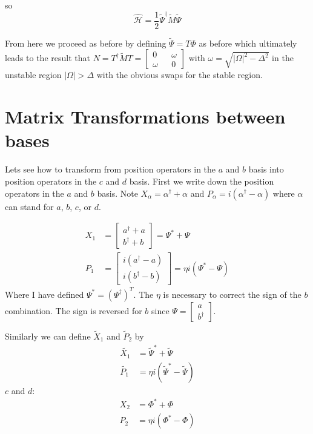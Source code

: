 \documentclass[12pt]{article}
\begin{document}
so
\begin{equation}
\hat{\mathcal{H}} = \frac{1}{2}\tilde{\Psi}^{\dag}\tilde{M}\tilde{\Psi}
\end{equation}

From here we proceed as before by defining $\tilde{\Psi} = T \Phi$ as before which ultimately leads to the result that $N = T^{\dag}\tilde{M}T = \begin{bmatrix}0&&\omega\\\omega&&0\end{bmatrix}$ with $\omega = \sqrt{|\Omega|^2-\Delta^2}$ in the unstable region $|\Omega|>\Delta$ with the obvious swaps for the stable region.

\section{Matrix Transformations between bases}

Lets see how to transform from position operators in the $a$ and $b$ basis into position operators in the $c$ and $d$ basis. First we write down the position operators in the $a$ and $b$ basis. Note $X_{\alpha} = \alpha^{\dag}+\alpha$ and $P_{\alpha} = i(\alpha^{\dag}-\alpha)$ where $\alpha$ can stand for $a$, $b$, $c$, or $d$.

\begin{align*}
X_1 &= 
\begin{bmatrix}
a^{\dag}+a\\
b^{\dag}+b
\end{bmatrix}
= \Psi^*+\Psi\\
P_1 &=
\begin{bmatrix}
i(a^{\dag}-a)\\
i(b^{\dag}-b)
\end{bmatrix}
=\eta i(\Psi^*-\Psi)
\end{align*}
Where I have defined $\Psi^* = (\Psi^{\dag})^T$. The $\eta$ is necessary to correct the sign of the $b$ combination. The sign is reversed for $b$ since $\Psi = \begin{bmatrix}a\\b^{\dag}\end{bmatrix}$.

Similarly we can define $\tilde{X}_1$ and $\tilde{P}_2$ by
\begin{align}
\tilde{X_1} &= \tilde{\Psi}^*+\tilde{\Psi}\\
\tilde{P_1} &= \eta i (\tilde{\Psi}^*-\tilde{\Psi})
\end{align} $c$ and $d$:
\begin{align}
X_2 &= \Phi^*+\Phi\\
P_2 &= \eta i(\Phi^*-\Phi)
\end{align}
\end{document}
